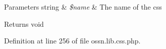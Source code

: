 \begin{DoxyParams}[1]{Parameters}
string & {\em \$name} & The name of the css\\
\hline
\end{DoxyParams}
\begin{DoxyReturn}{Returns}
void 
\end{DoxyReturn}


Definition at line 256 of file ossn.\+lib.\+css.\+php.


